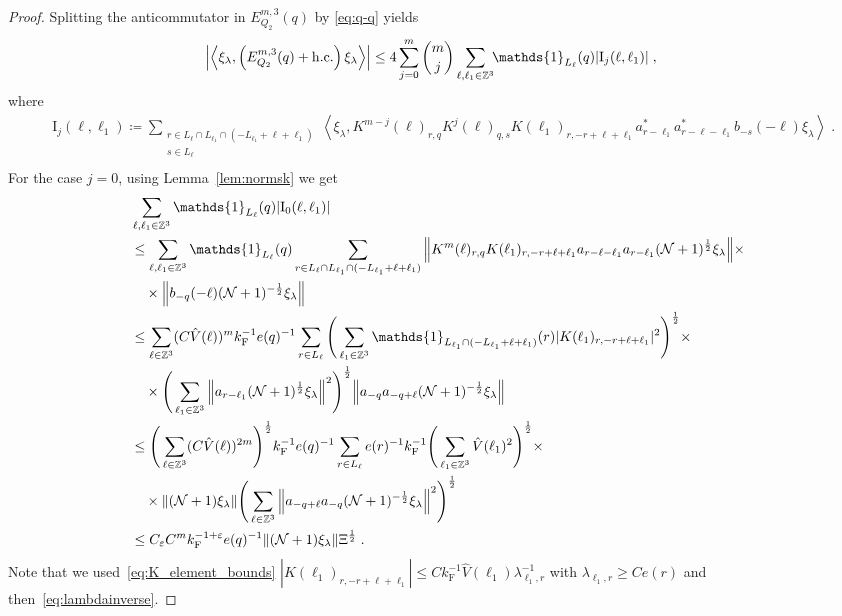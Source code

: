 \documentclass[12pt,a4paper]{article}
\numberwithin{equation}{section}
\newcommand{\1}{\mathbb{I}}
\newcommand{\F}{\mathrm{F}}
\newcommand{\I}{\mathrm{I}}
\newcommand{\kF}{k_\F}
\newcommand{\Zstar}{\mathbb{Z}^3} %
\newcommand{\Z}{\mathbb{Z}}
\newcommand{\NN}{\mathcal{N}}
\newcommand{\half}{\frac{1}{2}}
\newcommand{\eva}[1]{\left\langle #1 \right\rangle}
\theoremstyle{plain}
\theoremstyle{definition}
\theoremstyle{remark}
\theoremstyle{plain}
\theoremstyle{definition}
\theoremstyle{remark}
\begin{document}
\begin{proof}
Splitting the anticommutator in $ E^{m,3}_{Q_2}(q) $ by \eqref{eq:q-q} yields
\begin{equation} \label{eq:EQ2151}
\begin{aligned}
	&\abs{\eva{\xi_\lambda,\left(E^{m,3}_{Q_2}(q) + \mathrm{h.c.}\right) \xi_\lambda }}
	\le 4 \sum_{j=0}^m {{m}\choose j} \sum_{\ell,\ell_1 \in \Zstar}\!\! \mathds{1}_{L_\ell}(q) |\I_j(\ell, \ell_1)| \;,
	\end{aligned}
\end{equation}
where
\begin{equation}
\begin{aligned}
	& \I_j(\ell, \ell_1)
	\coloneq \sum_{\substack{r\in L_{\ell} \cap L_{\ell_1} \cap (-L_{\ell_1}+\ell+\ell_1)\\ s \in L_{\ell}}}
		\eva{\xi_\lambda, K^{m-j}(\ell)_{r,q} K^{j}(\ell)_{q,s} K(\ell_1)_{r,-r+\ell+\ell_1} a^*_{r-\ell_1} a^*_{r-\ell-\ell_1} b_{-s}(-\ell) \xi_\lambda} \;. \\
\end{aligned}
\end{equation}
For the case $j=0$, using Lemma~\ref{lem:normsk} we get
\begin{align}
	&\sum_{\ell,\ell_1 \in \Zstar} \mathds{1}_{L_\ell}(q) |\I_0(\ell, \ell_1)| \nonumber\\
	&\leq \sum_{\ell,\ell_1 \in \Zstar} \mathds{1}_{L_\ell}(q) \sum\limits_{\substack{r\in L_{\ell} \cap L_{\ell_1} \cap (-L_{\ell_1}+\ell+\ell_1)}}
		\norm{K^m(\ell)_{r,q} K(\ell_1)_{r,-r+\ell+\ell_1} a_{r-\ell-\ell_1} a_{r-\ell_1} (\NN+1)^\half \xi_\lambda} \times \nonumber\\
	&\quad \times \norm{ b_{-q}(-\ell) (\NN+1)^{-\half} \xi_\lambda}\nonumber\\
	&\leq \sum_{\ell \in \Zstar} (C \hat{V}(\ell))^m 
		\kF^{-1} e(q)^{-1} \sum\limits_{r \in L_\ell}
		\Bigg( \sum_{\ell_1 \in \Zstar} \mathds{1}_{L_{\ell_1} \cap (-L_{\ell_1}+\ell+\ell_1) }(r) |K(\ell_1)_{r,-r+\ell+\ell_1}|^2 \Bigg)^{\half} \times \nonumber\\
	&\quad \times \Bigg( \sum_{\ell_1 \in \Z^3} \norm{a_{r-\ell_1} (\NN+1)^\half \xi_\lambda}^2 \Bigg)^{\half}
		\norm{ a_{-q} a_{-q+\ell} (\NN+1)^{-\half} \xi_\lambda}\nonumber\\
	&\leq \Bigg( \sum_{\ell \in \Zstar} (C \hat{V}(\ell))^{2m} \Bigg)^{\half} 
		\kF^{-1} e(q)^{-1} \sum\limits_{r \in L_\ell} e(r)^{-1} \kF^{-1}
		\Bigg( \sum_{\ell_1 \in \Zstar} \hat{V}(\ell_1)^2 \Bigg)^{\half} \times \nonumber\\
	&\quad \times \norm{(\NN+1) \xi_\lambda}
		\Bigg( \sum_{\ell \in \Z^3} \norm{a_{-q+\ell} a_{-q} (\NN+1)^{-\half} \xi_\lambda}^2 \Bigg)^{\half} \nonumber\\
	&\leq C_\varepsilon C^m \kF^{-1 + \varepsilon} e(q)^{-1}
		\norm{ (\NN+1) \xi_\lambda } \Xi^{\half} \;. \label{eq:estEQ2151_Coulomb}
\end{align}
Note that we used~\eqref{eq:K_element_bounds} $ |K(\ell_1)_{r,-r+\ell+\ell_1}| \le C \kF^{-1} \hat{V}(\ell_1) \lambda_{\ell_1,r}^{-1} $ with $ \lambda_{\ell_1,r} \ge C e(r) $ and then~\eqref{eq:lambdainverse}.


\end{proof}
\end{document}
